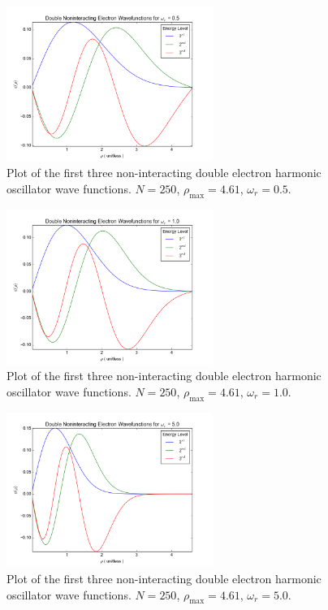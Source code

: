 \documentclass[a4paper,12pt]{report}
\begin{document}
\begin{figure}
\centering
 \includegraphics[width=0.6\textwidth]{SeHoWfWr05.png}
 \caption{Plot of the first three non-interacting double electron harmonic oscillator wave functions. $N = 250$, $\rho_{\mathrm{max}} = 4.61$, $\omega_r = 0.5$.}
 \label{fig:se05}
\end{figure}

\begin{figure}
\centering
 \includegraphics[width=0.6\textwidth]{SeHoWfWr1.png}
 \caption{Plot of the first three non-interacting double electron harmonic oscillator wave functions. $N = 250$, $\rho_{\mathrm{max}} = 4.61$, $\omega_r = 1.0$.}
 \label{fig:se1}
\end{figure}

\begin{figure}
\centering
 \includegraphics[width=0.6\textwidth]{SeHoWfWr5.png}
 \caption{Plot of the first three non-interacting double electron harmonic oscillator wave functions. $N = 250$, $\rho_{\mathrm{max}} = 4.61$, $\omega_r = 5.0$.}
 \label{fig:se5}
\end{figure}
\end{document}
